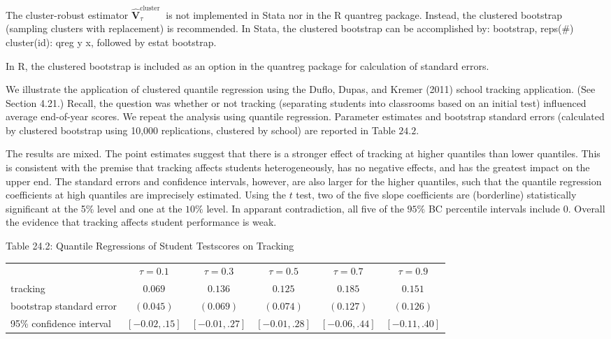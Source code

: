 \documentclass[10pt]{article}
\begin{document}
The cluster-robust estimator $\widehat{\boldsymbol{V}}_{\tau}^{\text {cluster }}$ is not implemented in Stata nor in the R quantreg package. Instead, the clustered bootstrap (sampling clusters with replacement) is recommended. In Stata, the clustered bootstrap can be accomplished by: bootstrap, reps(\#) cluster(id): qreg y x, followed by estat bootstrap.

In $\mathrm{R}$, the clustered bootstrap is included as an option in the quantreg package for calculation of standard errors.

We illustrate the application of clustered quantile regression using the Duflo, Dupas, and Kremer (2011) school tracking application. (See Section 4.21.) Recall, the question was whether or not tracking (separating students into classrooms based on an initial test) influenced average end-of-year scores. We repeat the analysis using quantile regression. Parameter estimates and bootstrap standard errors (calculated by clustered bootstrap using 10,000 replications, clustered by school) are reported in Table $24.2$.

The results are mixed. The point estimates suggest that there is a stronger effect of tracking at higher quantiles than lower quantiles. This is consistent with the premise that tracking affects students heterogeneously, has no negative effects, and has the greatest impact on the upper end. The standard errors and confidence intervals, however, are also larger for the higher quantiles, such that the quantile regression coefficients at high quantiles are imprecisely estimated. Using the $t$ test, two of the five slope coefficients are (borderline) statistically significant at the 5\% level and one at the $10 \%$ level. In apparant contradiction, all five of the $95 \%$ BC percentile intervals include 0. Overall the evidence that tracking affects student performance is weak.

Table 24.2: Quantile Regressions of Student Testscores on Tracking

\begin{tabular}{lccccc}
\hline\hline
 & $\tau=0.1$ & $\tau=0.3$ & $\tau=0.5$ & $\tau=0.7$ & $\tau=0.9$ \\
\cline { 2 - 6 }
tracking & $0.069$ & $0.136$ & $0.125$ & $0.185$ & $0.151$ \\
bootstrap standard error & $(0.045)$ & $(0.069)$ & $(0.074)$ & $(0.127)$ & $(0.126)$ \\
95\% confidence interval & $[-0.02, .15]$ & $[-0.01, .27]$ & $[-0.01, .28]$ & $[-0.06, .44]$ & $[-0.11, .40]$ \\
\hline
\end{tabular}
\end{document}

